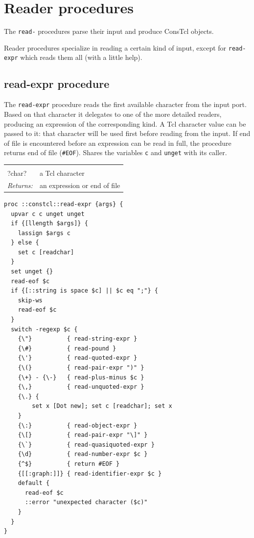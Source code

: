 \documentclass[a5paper,draft]{memoir}
\begin{document}
\section{Reader procedures}
\label{reader-procedures}

The \texttt{read-} procedures parse their input and produce ConsTcl objects.

Reader procedures specialize in reading a certain kind of input, except for \texttt{read-expr} which reads them all (with a little help).

\subsection{read-expr procedure}
\label{readexpr-procedure}

The \texttt{read-expr} procedure reads the first available character from the input port. Based on that character it delegates to one of the more detailed readers, producing an expression of the corresponding kind. A Tcl character value can be passed to it: that character will be used first before reading from the input. If end of file is encountered before an expression can be read in full, the procedure returns end of file (\texttt{\#EOF}). Shares the variables \texttt{c} and \texttt{unget} with its caller.

\noindent\begin{tabular}{ |p{1.9cm} p{6.5cm}| }
\hline
\rowcolor[HTML]{CCCCCC} \multicolumn{2}{|l|}{\textbf{read-expr (internal)}} \\
?char? & a Tcl character \\
\textit{Returns:} & an expression or end of file \\
\hline
\end{tabular}

\begin{lstlisting}
proc ::constcl::read-expr {args} {
  upvar c c unget unget
  if {[llength $args]} {
    lassign $args c
  } else {
    set c [readchar]
  }
  set unget {}
  read-eof $c
  if {[::string is space $c] || $c eq ";"} {
    skip-ws
    read-eof $c
  }
  switch -regexp $c {
    {\"}          { read-string-expr }
    {\#}          { read-pound }
    {\'}          { read-quoted-expr }
    {\(}          { read-pair-expr ")" }
    {\+} - {\-}   { read-plus-minus $c }
    {\,}          { read-unquoted-expr }
    {\.} {
        set x [Dot new]; set c [readchar]; set x
    }
    {\:}          { read-object-expr }
    {\[}          { read-pair-expr "\]" }
    {\`}          { read-quasiquoted-expr }
    {\d}          { read-number-expr $c }
    {^$}          { return #EOF }
    {[[:graph:]]} { read-identifier-expr $c }
    default {
      read-eof $c
      ::error "unexpected character ($c)"
    }
  }
}
\end{lstlisting}
\end{document}
